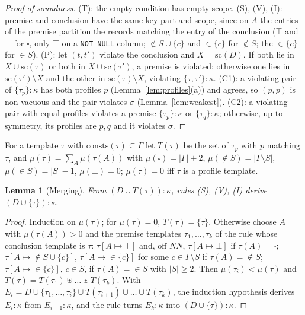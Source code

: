 \documentclass[conference]{IEEEtran}
\newtheorem{lemma}[theorem]{Lemma}
\theoremstyle{definition}
\newcommand{\sql}[1]{\texttt{#1}}
\newcommand{\NN}{\mathit{NN}}
\newcommand{\any}{\square}
\newcommand{\scope}{\mathrm{sc}}
\newcommand{\consts}{\mathrm{consts}}
\begin{document}
\begin{proof}[Proof of soundness]
(T): the empty condition has empty scope. (S), (V), (I): premise and conclusion have the same
key part and scope, since on $A$ the entries of the premise partition the records matching
the entry of the conclusion ($\top$ and $\bot$ for $\any$, only $\top$ on a \sql{NOT NULL} column;
${\notin}S{\cup}\{c\}$ and ${\in}\{c\}$ for ${\notin}S$; the ${\in}\{c\}$ for ${\in}S$). (P): let
$(t,t')$ violate the conclusion and $X=\scope(D)$. If both lie in $X\cup\scope(\tau)$ or both in
$X\cup\scope(\tau')$, a premise is violated; otherwise one lies in $\scope(\tau')\setminus X$ and the
other in $\scope(\tau)\setminus X$, violating $\{\tau,\tau'\}:\kappa$. (C1): a violating pair of
$\{\tau_p\}:\kappa$ has both profiles $p$ (Lemma~\ref{lem:profiles}(a)) and agrees, so $(p,p)$ is
non-vacuous and the pair violates $\sigma$ (Lemma~\ref{lem:weakest}). (C2): a violating pair with
equal profiles violates a premise $\{\tau_p\}:\kappa$ or $\{\tau_q\}:\kappa$; otherwise, up to symmetry,
its profiles are $p,q$ and it violates $\sigma$.
\end{proof}

For a template $\tau$ with $\consts(\tau)\subseteq\Gamma$ let $T(\tau)$ be the set of $\tau_p$ with $p$
matching $\tau$, and $\mu(\tau)=\sum_A\mu(\tau(A))$ with $\mu(\any)=|\Gamma|+2$,
$\mu({\notin}S)=|\Gamma\setminus S|$, $\mu({\in}S)=|S|-1$, $\mu(\bot)=0$; $\mu(\tau)=0$ iff $\tau$ is a
profile template.

\begin{lemma}[Merging]\label{lem:merge}
From $(D\cup T(\tau)):\kappa$, rules (S), (V), (I) derive $(D\cup\{\tau\}):\kappa$.
\end{lemma}

\begin{proof}
Induction on $\mu(\tau)$; for $\mu(\tau)=0$, $T(\tau)=\{\tau\}$. Otherwise choose $A$ with
$\mu(\tau(A))>0$ and the premise templates $\tau_1,\dots,\tau_k$ of the rule whose conclusion
template is $\tau$: $\tau[A{\mapsto}\top]$ and, off $\NN$, $\tau[A{\mapsto}\bot]$ if $\tau(A)=\any$;
$\tau[A{\mapsto}{\notin}S{\cup}\{c\}]$, $\tau[A{\mapsto}{\in}\{c\}]$ for some $c\in\Gamma\setminus S$ if
$\tau(A)={\notin}S$; $\tau[A{\mapsto}{\in}\{c\}]$, $c\in S$, if $\tau(A)={\in}S$ with $|S|\ge2$. Then
$\mu(\tau_i)<\mu(\tau)$ and $T(\tau)=T(\tau_1)\uplus\dots\uplus T(\tau_k)$. With
$E_i=D\cup\{\tau_1,\dots,\tau_i\}\cup T(\tau_{i+1})\cup\dots\cup T(\tau_k)$, the induction hypothesis
derives $E_i:\kappa$ from $E_{i-1}:\kappa$, and the rule turns $E_k:\kappa$ into $(D\cup\{\tau\}):\kappa$.
\end{proof}
\end{document}
